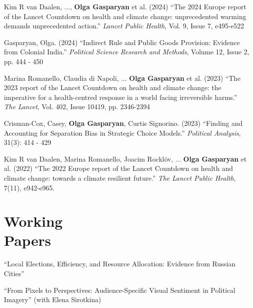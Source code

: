 \documentclass[margin,line,10.95pt]{res}
\begin{document}
\begin{resume}
\vspace*{-2.5mm}

Kim R van Daalen, ..., \textbf{Olga Gasparyan} et al.  (2024) ``The 2024 Europe report of the Lancet Countdown on health and climate change: unprecedented warming demands unprecedented action.'' \textit{Lancet Public Health}, Vol. 9, Issue 7, e495-e522


\vspace*{-2.5mm}


Gasparyan, Olga. (2024) ``Indirect Rule and Public Goods Provision: Evidence from Colonial India.'' \textit{Political Science Research and Methods}, Volume 12, Issue 2, pp. 444 - 450


\vspace*{-2.5mm}

Marina Romanello, Claudia di Napoli, ... \textbf{Olga Gasparyan} et al. (2023) ``The 2023 report of the Lancet Countdown on health and climate change: the imperative for a health-centred response in a world facing irreversible harms.'' \textit{The Lancet},  Vol. 402, Issue 10419, pp. 2346-2394  


\vspace*{-2.5mm}

Crisman-Cox, Casey, \textbf{Olga Gasparyan}, Curtis Signorino. (2023) ``Finding and Accounting for Separation Bias in Strategic Choice Models.'' \textit{Political Analysis}, 31(3): 414 - 429

\vspace*{-2.5mm}

Kim R van Daalen, Marina Romanello, Joacim Rocklöv, ... \textbf{Olga Gasparyan} et al. (2022) ``The 2022 Europe report of the Lancet Countdown on health and climate change: towards a climate resilient future.'' \textit{The Lancet Public Health}, 7(11), e942-e965.


\section{\sc Working \\ Papers}

``Local Elections, Efficiency, and Resource Allocation: Evidence from Russian Cities''

\vspace*{-2.5mm}
``From Pixels to Perspectives: Audience-Specific Visual Sentiment in Political Imagery'' (with Elena Sirotkina) 



\end{resume}
\end{document}

